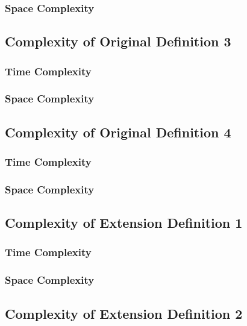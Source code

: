 \documentclass[conference]{IEEEtran}
\begin{document}
\subsubsection{Space Complexity}

\subsection{Complexity of Original Definition 3}

\subsubsection{Time Complexity}

\subsubsection{Space Complexity}

\subsection{Complexity of Original Definition 4}

\subsubsection{Time Complexity}

\subsubsection{Space Complexity}

\subsection{Complexity of Extension Definition 1}

\subsubsection{Time Complexity}

\subsubsection{Space Complexity}

\subsection{Complexity of Extension Definition 2}
\end{document}
